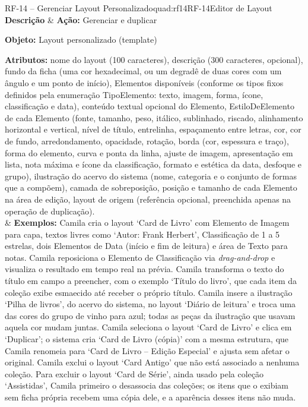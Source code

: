 \FloatBarrier
\begin{quadrolongo}{RF-14 -- Gerenciar Layout Personalizado}{quad:rf14}{RF-14}{Editor de Layout}
\textbf{Descrição}   &
\textbf{Ação:} Gerenciar e duplicar

\textbf{Objeto:} Layout personalizado (template)

\textbf{Atributos:} nome do layout (100 caracteres), descrição (300 caracteres, opcional), fundo da ficha (uma cor hexadecimal, ou um degradê de duas cores com um ângulo e um ponto de início), Elementos disponíveis (conforme os tipos fixos definidos pela enumeração TipoElemento: texto, imagem, forma, ícone, classificação e data), conteúdo textual opcional do Elemento, EstiloDeElemento de cada Elemento (fonte, tamanho, peso, itálico, sublinhado, riscado, alinhamento horizontal e vertical, nível de título, entrelinha, espaçamento entre letras, cor, cor de fundo, arredondamento, opacidade, rotação, borda (cor, espessura e traço), forma do elemento, curva e ponta da linha, ajuste de imagem, apresentação em lista, nota máxima e ícone da classificação, formato e estética da data, desfoque e grupo), ilustração do acervo do sistema (nome, categoria e o conjunto de formas que a compõem), camada de sobreposição, posição e tamanho de cada Elemento na área de edição, layout de origem (referência opcional, preenchida apenas na operação de duplicação). \\
& \textbf{Exemplos:} Camila cria o layout `Card de Livro' com Elemento de Imagem para capa, textos livres como `Autor: Frank Herbert', Classificação de 1 a 5 estrelas, dois Elementos de Data (início e fim de leitura) e área de Texto para notas.
Camila reposiciona o Elemento de Classificação via \textit{drag-and-drop} e visualiza o resultado em tempo real na prévia.
Camila transforma o texto do título em campo a preencher, com o exemplo `Título do livro', que cada item da coleção exibe esmaecido até receber o próprio título.
Camila insere a ilustração `Pilha de livros', do acervo do sistema, no layout `Diário de leitura' e troca uma das cores do grupo de vinho para azul; todas as peças da ilustração que usavam aquela cor mudam juntas.
Camila seleciona o layout `Card de Livro' e clica em `Duplicar'; o sistema cria `Card de Livro (cópia)' com a mesma estrutura, que Camila renomeia para `Card de Livro -- Edição Especial' e ajusta sem afetar o original.
Camila exclui o layout `Card Antigo' que não está associado a nenhuma coleção.
Para excluir o layout `Card de Série', ainda usado pela coleção `Assistidas', Camila primeiro o desassocia das coleções; os itens que o exibiam sem ficha própria recebem uma cópia dele, e a aparência desses itens não muda. \\

\end{quadrolongo}
